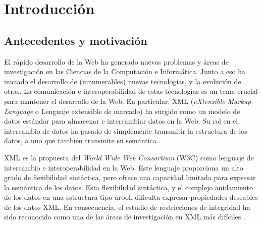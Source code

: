 \chapter{Introducci\'on}
\label{cap:intro}

\section{Antecedentes y motivaci\'on}
\label{intro:motivacion}

El rápido desarrollo de la Web ha generado nuevos problemas y áreas de investigación en las Ciencias de la Computación e Informática. Junto a eso ha iniciado el desarrollo de (innumerables) nuevas tecnologías, y la evolución de otras. La comunicación e interoperabilidad de estas tecnologías es un tema crucial para mantener el desarrollo de la Web. En particular, XML (\textit{eXtensible Markup Language} o Lenguaje extensible de marcado) ha surgido como un modelo de datos estándar para almacenar e intercambiar datos en la Web. Su rol en el intercambio de datos ha pasado de simplemente transmitir la estructura de los datos, a uno que también transmite su semántica \citep{Benedikt:2003, Davidson:2007}.

XML \citep{XML:2006} es la propuesta del \textit{World Wide Web Consortium} (W3C) como lenguaje de intercambio e interoperabilidad en la Web. Este lenguaje proporciona un alto grado de flexibilidad sintáctica, pero ofrece una capacidad limitada para expresar la semántica de los datos. Esta flexibilidad sintáctica, y el complejo anidamiento de los datos en una estructura tipo árbol, dificulta expresar propiedades deseables de los datos XML. En consecuencia, el estudio de restricciones de integridad ha sido reconocido como una de las áreas de investigación en XML más difíciles \citep{Fan:2005,Suciu:2001,Vianu:2003,Widom:1999}.

